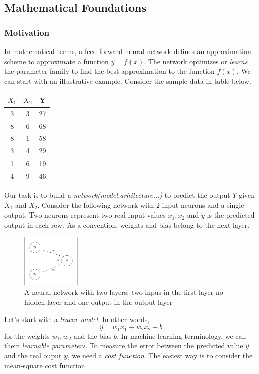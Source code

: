 \documentclass[12pt]{article}
\begin{document}
\subsection{Mathematical Foundations}
\label{MF}
\subsubsection{Motivation}
\label{mt}
In mathematical terms, a feed forward neural network defines an approximation scheme    to approximate a function $y=f(x)$. The network optimizes or \textit{learns} the parameter family \bm{$\theta$} to find the best approximation to the function $f(x)$. We can start with an illustrative example. Consider the sample data in table below. 

\begin{center}
\begin{tabular}{ |c|c|c| } 
\hline
$X_1$ & $X_2$ & Y \\ 
\hline
3&	3&  27 \\
8&	6&	68 \\
8&	1&	58 \\
3&	4&	29 \\
1&	6&	19 \\
4&	9&	46 \\
\hline
\end{tabular}
\end{center}

Our task is to build a \textit{network(model,arhitecture,..)} to predict the output $Y$ given $X_1$ and $X_2$. Consider the following network with 2 input neurons 
and a single output. Two neurons represent two real input values $x_1,x_2$  and $\hat{y}$ is the predicted output in each row. As a convention, weights and bias belong to the next layer. 
\begin{figure}[h]
  \centering
  \includegraphics[width=0.25\textwidth]{2x1.png}
  \caption{A neural network with two layers; two inpus in the first layer no hidden layer and one output in the output layer}
\end{figure} 

\noindent Let's start with  a \textit{linear model}. In other words,
\begin{equation}
\label{eq:model}
\hat{y}=w_{1}x_{1}+w_{2}x_{2}+b
\end{equation}
for the weights $w_1,w_2$ and the bias $b$. In machine learning terminology, we call them \textit{learnable parameters}. To measure the error between the predicted value $\hat{y}$ and the real ouput $y$, we need a \textit{cost function}. The easiest way is to consider the mean-square cost function 
\end{document}
